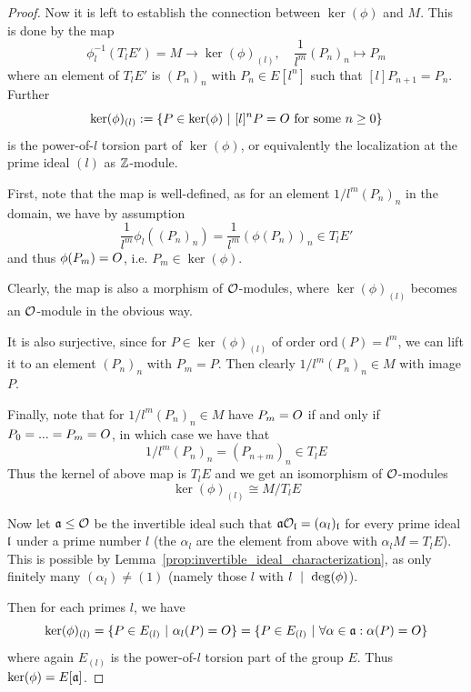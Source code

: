 \begin{proof}
    Now it is left to establish the connection between $\ker(\phi)$ and $M$.
    This is done by the map
    \begin{equation*}
        \phi_l^{-1}(T_lE') = M \to \ker(\phi)_{(l)}, \quad \frac 1 {l^m} (P_n)_n \mapsto P_m
    \end{equation*}
    where an element of $T_lE'$ is $(P_n)_n$ with $P_n \in E[l^n]$ such that $[l]P_{n + 1} = P_n$.
    Further
    \begin{equation*}
        \ker(\phi)_{(l)} := \{ P \in \ker(\phi) \ | \ \text{$[l]^nP = O$ for some $n \geq 0$}\}
    \end{equation*}
    is the power-of-$l$ torsion part of $\ker(\phi)$, or equivalently the localization at the prime ideal $(l)$ as $\mathbb{Z}$-module.

    First, note that the map is well-defined, as for an element $1/l^m (P_n)_n$ in the domain, we have by assumption
    \begin{equation*}
        \frac 1 {l^m} \phi_l((P_n)_n) = \frac 1 {l^m} (\phi(P_n))_n \in T_lE'
    \end{equation*}
    and thus $\phi(P_m) = O$, i.e. $P_m \in \ker(\phi)$.

    Clearly, the map is also a morphism of $\mathcal{O}$-modules, where $\ker(\phi)_{(l)}$ becomes an $\mathcal{O}$-module in the obvious way.
    
    It is also surjective, since for $P \in \ker(\phi)_{(l)}$ of order $\mathrm{ord}(P) = l^m$, we can lift it to an element $(P_n)_n$ with $P_m = P$.
    Then clearly $1/l^m(P_n)_n \in M$ with image $P$.

    Finally, note that for $1/l^m(P_n)_n \in M$ have $P_m = O$ if and only if $P_0 = ... = P_m = O$, in which case we have that
    \begin{equation*}
        1/l^m(P_n)_n = (P_{n + m})_n \in T_lE
    \end{equation*}
    Thus the kernel of above map is $T_lE$ and we get an isomorphism of $\mathcal{O}$-modules
    \begin{equation*}
        \ker(\phi)_{(l)} \cong M / T_lE
    \end{equation*}

    Now let $\mathfrak{a} \leq \mathcal{O}$ be the invertible ideal such that $\mathfrak{a}\mathcal{O}_{\mathfrak{l}} = (\alpha_l)_{\mathfrak{l}}$ for every prime ideal $\mathfrak{l}$ under a prime number $l$ (the $\alpha_l$ are the element from above with $\alpha_l M = T_lE$).
    This is possible by Lemma~\ref{prop:invertible_ideal_characterization}, as only finitely many $(\alpha_l) \neq (1)$ (namely those $l$ with $l \ \mid \  \deg(\phi)$).

    Then for each primes $l$, we have
    \begin{equation*}
        \ker(\phi)_{(l)} = \{ P \in E_{(l)} \ | \ \alpha_l(P) = O \} = \{ P \in E_{(l)} \ | \ \forall \alpha \in \mathfrak{a}: \alpha(P) = O \}
    \end{equation*}
    where again $E_{(l)}$ is the power-of-$l$ torsion part of the group $E$.
    Thus $\ker(\phi) = E[\mathfrak{a}]$.
\end{proof}
